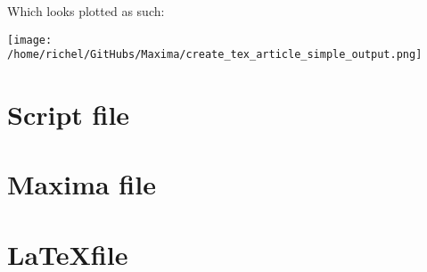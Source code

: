 \documentclass{article}
\begin{document}
Which looks plotted as such:

\texttt{[image: /home/richel/GitHubs/Maxima/create\_tex\_article\_simple\_output.png]}

\appendix

\section{Script file}



\section{Maxima file}



\section{\LaTeX file}


\end{document}
